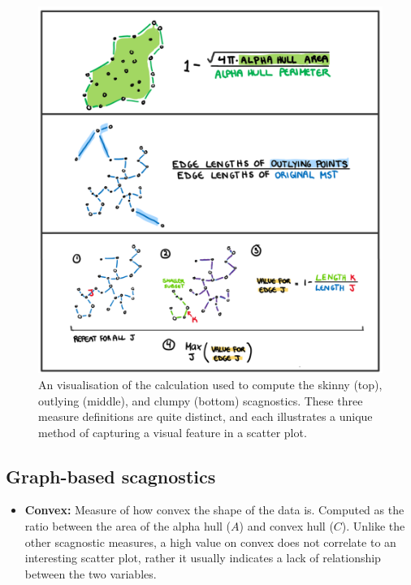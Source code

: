 \begin{Schunk}
\begin{figure}
\includegraphics[width=1\linewidth]{figures/drawnmeasures} \caption[ An visualisation of the calculation used to compute the skinny (top), outlying (middle), and clumpy (bottom) scagnostics]{ An visualisation of the calculation used to compute the skinny (top), outlying (middle), and clumpy (bottom) scagnostics. These three measure definitions are quite distinct, and each illustrates a unique method of capturing a visual feature in a scatter plot.}\label{fig:scagdrawn}
\end{figure}
\end{Schunk}

\hypertarget{graph-based-scagnostics}{%
\subsection{Graph-based scagnostics}\label{graph-based-scagnostics}}

\begin{itemize}
\tightlist
\item
  \textbf{Convex:} Measure of how convex the shape of the data is.
  Computed as the ratio between the area of the alpha hull (\(A\)) and
  convex hull (\(C\)). Unlike the other scagnostic measures, a high
  value on convex does not correlate to an interesting scatter plot,
  rather it usually indicates a lack of relationship between the two
  variables.
\end{itemize}

